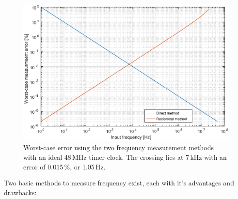 \begin{figure}
	\centering
	\includegraphics[width=.9\textwidth] {img/freqmethods.eps}
	\caption[Frequency measurement methods comparison]{\label{fig:freqmethods-graph}Worst-case error using the two frequency measurement methods with an ideal 48\,MHz timer clock. The crossing lies at 7\,kHz with an error of 0.015\,\%, or 1.05\,Hz.}
\end{figure}

Two basic methods to measure frequency exist, each with it's advantages and drawbacks:

